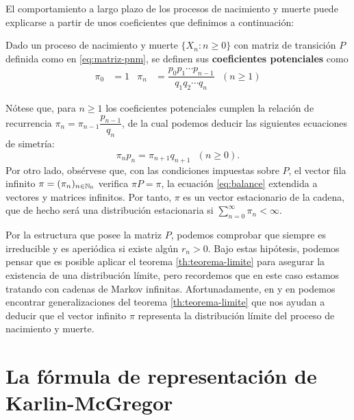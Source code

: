     El comportamiento a largo plazo de los procesos de nacimiento y muerte puede explicarse a partir de unos coeficientes que definimos a continuación:

    \begin{definicion}
        \label{def:coeficientes-potenciales}
        Dado un proceso de nacimiento y muerte $\{X_n:n\geq 0\}$ con matriz de transición $P$ definida como en \eqref{eq:matriz-pnm}, se definen sus \textbf{coeficientes potenciales} como
        \begin{align}
            \label{eq:coeficientes-potenciales}
            \pi_0&= 1 & \pi_n &= \dfrac{p_0 p_1 \cdots p_{n-1}}{q_1 q_2 \cdots q_n} \ \ \ (n\geq 1)
        \end{align}
    \end{definicion}
    Nótese que, para $n\geq 1$ los coeficientes potenciales cumplen la relación de recurrencia $\pi_n = \pi_{n-1} \dfrac{p_{n-1}}{q_n}$, de la cual podemos deducir las siguientes ecuaciones de simetría:
    \begin{equation}
        \label{eq:ecs-simetria}
        \pi_n p_n = \pi_{n+1}q_{n+1} \ \ \ (n\geq 0).
    \end{equation} 
    Por otro lado, obsérvese que, con las condiciones impuestas sobre $P$, el vector fila infinito $\pi = (\pi_n)_{n\in\mathbb{N}_0}$ verifica $\pi P = \pi$, la ecuación \eqref{eq:balance} extendida a vectores y matrices infinitos. Por tanto, $\pi$ es un vector estacionario de la cadena, que de hecho será una distribución estacionaria si $\sum_{n=0}^\infty \pi_n < \infty$.

    Por la estructura que posee la matriz $P$, podemos comprobar que siempre es irreducible y es aperiódica si existe algún $r_n>0$. Bajo estas hipótesis, podemos pensar que es posible aplicar el teorema \ref{th:teorema-limite} para asegurar la existencia de una distribución límite, pero recordemos que en este caso estamos tratando con cadenas de Markov infinitas. Afortunadamente, en \cite[Theorem 5.5]{Seneta} y en \cite[Theorem 2.3]{Manuel} podemos encontrar generalizaciones del teorema \ref{th:teorema-limite} que nos ayudan a deducir que el vector infinito $\pi$ representa la distribución límite del proceso de nacimiento y muerte.

    
    \section{La fórmula de representación de Karlin-McGregor}
    \label{section:formula-representacion}

